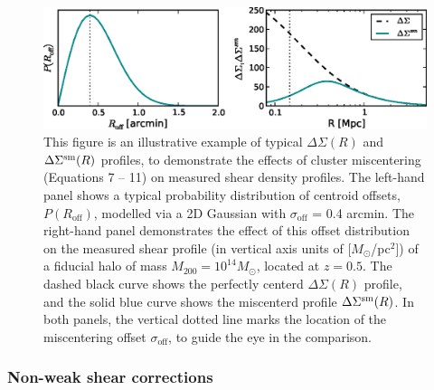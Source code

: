 \begin{figure}
\begin{center}
  \includegraphics[scale=1.0]{plots_ch4/PofRc_DeltaSigma_example.eps}
  \caption[Example of Miscentering Effect on Shear Profile]{This figure is an illustrative example of typical $\Delta\Sigma(R)$ and $\Delta\Sigma^{\rm sm}(R)$ profiles, to demonstrate the effects of cluster miscentering (Equations 7 -- 11) on measured shear density profiles. The left-hand panel shows a typical probability distribution of centroid offsets, $P(R_{\mathrm{off}})$, modelled via a 2D Gaussian with $\sigma_{\mathrm{off}}$ = 0.4 arcmin. The right-hand panel demonstrates the effect of this offset distribution on the measured shear profile (in vertical axis units of [$M_{\odot}$/pc$^2$]) of a fiducial halo of mass $M_{200}=10^{14} M_{\odot}$, located at $z=0.5$. The dashed black curve shows the perfectly centerd $\Delta\Sigma(R)$ profile, and the solid blue curve shows the miscenterd profile $\Delta\Sigma^{\rm sm}(R)$. In both panels, the vertical dotted line marks the location of the miscentering offset $\sigma_{\mathrm{off}}$, to guide the eye in the comparison.}
\label{plot:miscentering}
\end{center}
\end{figure}


\subsubsection{Non-weak shear corrections}


